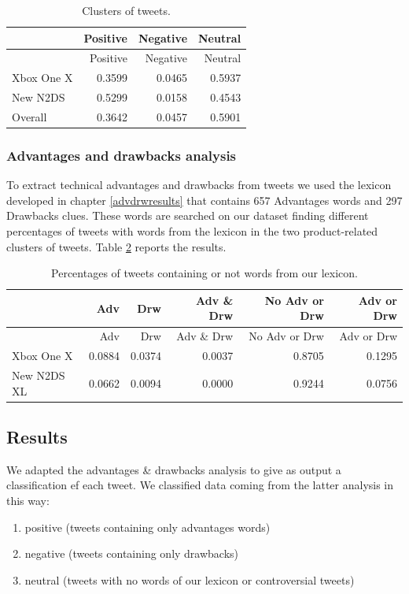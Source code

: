 \documentclass[]{book}
\providecommand{\tightlist}{%
  \setlength{\itemsep}{0pt}\setlength{\parskip}{0pt}}
\begin{document}
\begin{longtable}[]{@{}lrrr@{}}
\caption{\label{tab:tweetab2} Clusters of tweets.}\tabularnewline
\toprule
& Positive & Negative & Neutral\tabularnewline
\midrule
\endfirsthead
\toprule
& Positive & Negative & Neutral\tabularnewline
\midrule
\endhead
Xbox One X & 0.3599 & 0.0465 & 0.5937\tabularnewline
New N2DS & 0.5299 & 0.0158 & 0.4543\tabularnewline
Overall & 0.3642 & 0.0457 & 0.5901\tabularnewline
\bottomrule
\end{longtable}

\subsubsection*{Advantages and drawbacks
analysis}\label{advantages-and-drawbacks-analysis}

To extract technical advantages and drawbacks from tweets we used the
lexicon developed in chapter \ref{advdrwresults} that contains 657
Advantages words and 297 Drawbacks clues. These words are searched on
our dataset finding different percentages of tweets with words from the
lexicon in the two product-related clusters of tweets. Table
\ref{tab:tweetab3} reports the results.

\begin{longtable}[]{@{}lrrrrr@{}}
\caption{\label{tab:tweetab3} Percentages of tweets containing or not words
from our lexicon.}\tabularnewline
\toprule
& Adv & Drw & Adv \& Drw & No Adv or Drw & Adv or Drw\tabularnewline
\midrule
\endfirsthead
\toprule
& Adv & Drw & Adv \& Drw & No Adv or Drw & Adv or Drw\tabularnewline
\midrule
\endhead
Xbox One X & 0.0884 & 0.0374 & 0.0037 & 0.8705 & 0.1295\tabularnewline
New N2DS XL & 0.0662 & 0.0094 & 0.0000 & 0.9244 & 0.0756\tabularnewline
\bottomrule
\end{longtable}

\subsection{Results}\label{results-9}

We adapted the advantages \& drawbacks analysis to give as output a
classification ef each tweet. We classified data coming from the latter
analysis in this way:

\begin{enumerate}
\def\labelenumi{\arabic{enumi}.}
\tightlist
\item
  positive (tweets containing only advantages words)
\item
  negative (tweets containing only drawbacks)
\item
  neutral (tweets with no words of our lexicon or controversial tweets)
\end{enumerate}
\end{document}
